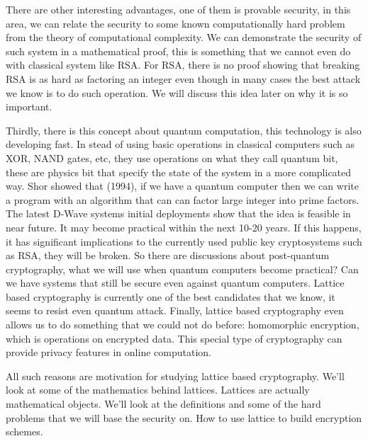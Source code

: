 There are other interesting advantages, one of them is provable security, in
this area, we can relate the security to some known computationally hard problem
from the theory of computational complexity. We can demonstrate the security of
such system in a mathematical proof, this is something that we cannot even do
with classical system like RSA. For RSA, there is no proof showing that breaking
RSA is as hard as factoring an integer even though in many cases the best attack
we know is to do such operation. We will discuss this idea later on why it is so
important.

Thirdly, there is this concept about quantum computation, this technology is
also developing fast.  In stead of using basic operations in classical computers
such as XOR, NAND gates, etc, they use operations on what they call quantum bit,
these are physics bit that specify the state of the system in a more complicated
way. Shor showed that (1994), if we have a quantum computer then we can write a
program with an algorithm that can can factor large integer into prime factors.
The latest D-Wave systems initial deployments show that the idea is feasible in
near future. It may become practical within the next 10-20 years. If this
happens, it has significant implications to the currently used public key
cryptosystems such as RSA, they will be broken. So there are discussions about
post-quantum cryptography, what we will use when quantum computers become
practical?  Can we have systems that still be secure even against quantum
computers. Lattice based cryptography is currently one of the best candidates
that we know, it seems to resist even quantum attack.  Finally, lattice based
cryptography even allows us to do something that we could not do before:
homomorphic encryption, which is operations on encrypted data. This special type
of cryptography can provide privacy features in online computation.

All such reasons are motivation for studying lattice based cryptography. We’ll
look at some of the mathematics behind lattices. Lattices are actually
mathematical objects. We’ll look at the definitions and some of the hard
problems that we will base the security on. How to use lattice to build
encryption schemes.

